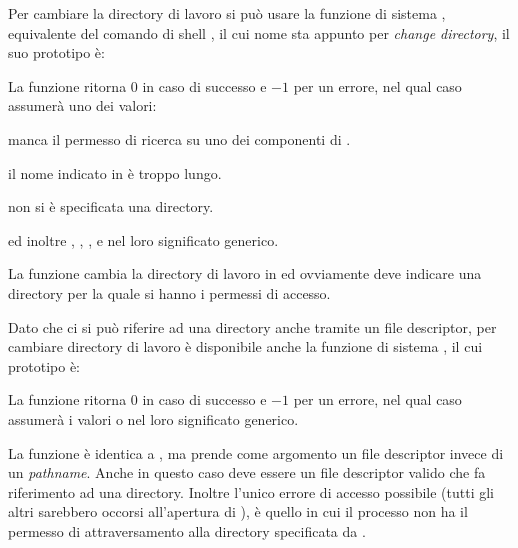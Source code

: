 Per cambiare la directory di lavoro si può usare la funzione di sistema
, equivalente del comando di shell , il cui nome sta
appunto per \textit{change directory}, il suo prototipo è:

\begin{funcproto}{
}
{La funzione ritorna $0$ in caso di successo e $-1$ per un errore, nel qual
  caso  assumerà uno dei valori: 
  \begin{errlist}
  \item[\errcode{EACCES}] manca il permesso di ricerca su uno dei componenti
    di .
  \item[\errcode{ENAMETOOLONG}] il nome indicato in  è troppo lungo.
  \item[\errcode{ENOTDIR}] non si è specificata una directory.
  \end{errlist}
  ed inoltre , , ,  e
   nel loro significato generico.}
\end{funcproto}

La funzione cambia la directory di lavoro in  ed
ovviamente  deve indicare una directory per la quale si hanno
i permessi di accesso.

Dato che ci si può riferire ad una directory anche tramite un file descriptor,
per cambiare directory di lavoro è disponibile anche la funzione di sistema
, il cui prototipo è:

\begin{funcproto}{
}
{La funzione ritorna $0$ in caso di successo e $-1$ per un errore, nel qual
  caso  assumerà i valori  o  nel loro
  significato generico.}
\end{funcproto}

La funzione è identica a , ma prende come argomento un file
descriptor  invece di un \textit{pathname}. Anche in questo
caso  deve essere un file descriptor valido che fa riferimento ad
una directory. Inoltre l'unico errore di accesso possibile (tutti gli altri
sarebbero occorsi all'apertura di ), è quello in cui il processo non
ha il permesso di attraversamento alla directory specificata da .

